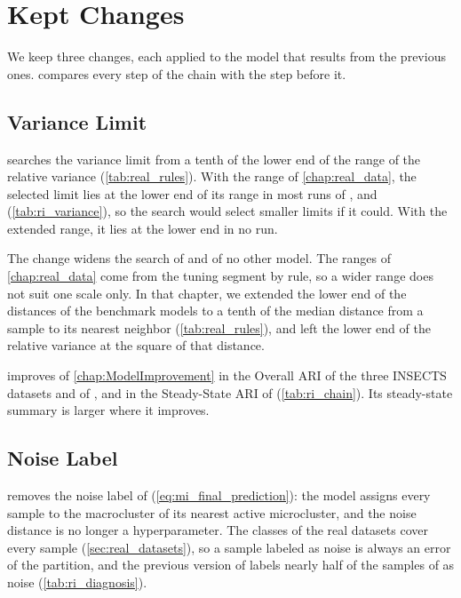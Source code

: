 \section{Kept Changes}
\label{sec:ri_kept}

We keep three changes, each applied to the model that results from the previous ones.  compares every step of the chain with the step before it.



\subsection{Variance Limit}
\label{subsec:ri_low_variance}

 searches the variance limit from a tenth of the lower end of the range of the relative variance (\cref{tab:real_rules}). With the range of \cref{chap:real_data}, the selected limit lies at the lower end of its range in most runs of \InsectsAbrupt, \InsectsIncremental and \Pendigits (\cref{tab:ri_variance}), so the search would select smaller limits if it could. With the extended range, it lies at the lower end in no run.



The change widens the search of \MicroTEDAClusPlus and of no other model. The ranges of \cref{chap:real_data} come from the tuning segment by rule, so a wider range does not suit one scale only. In that chapter, we extended the lower end of the distances of the benchmark models to a tenth of the median distance from a sample to its nearest neighbor (\cref{tab:real_rules}), and left the lower end of the relative variance at the square of that distance.

 improves \MicroTEDAClusPlus of \cref{chap:ModelImprovement} in the Overall ARI of the three INSECTS datasets and of \Pendigits, and in the Steady-State ARI of \Pendigits (\cref{tab:ri_chain}). Its steady-state summary is larger where it improves.

\subsection{Noise Label}
\label{subsec:ri_no_noise}

 removes the noise label of \MicroTEDAClusPlus (\cref{eq:mi_final_prediction}): the model assigns every sample to the macrocluster of its nearest active microcluster, and the noise distance is no longer a hyperparameter. The classes of the real datasets cover every sample (\cref{sec:real_datasets}), so a sample labeled as noise is always an error of the partition, and the previous version of \MicroTEDAClusPlus labels nearly half of the samples of \InsectsAbrupt as noise (\cref{tab:ri_diagnosis}).

